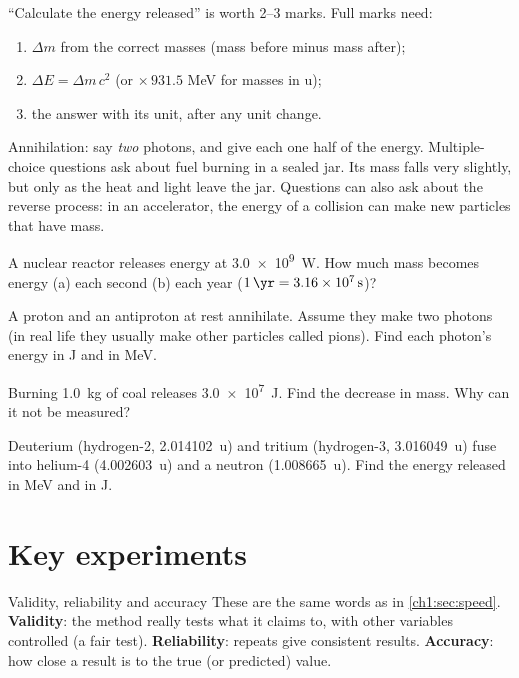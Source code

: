 \begin{examtip}
``Calculate the energy released'' is worth 2--3 marks. Full marks need:
\begin{enumerate}
  \item $\Delta m$ from the correct masses (mass before minus mass after);
  \item $\Delta E = \Delta m\,c^2$ (or $\times\,931.5$ MeV for masses in u);
  \item the answer with its unit, after any unit change.
\end{enumerate}
Annihilation: say \emph{two} photons, and give each one half of the energy. Multiple-choice
questions ask about fuel burning in a sealed jar. Its mass falls very slightly, but only as the
heat and light leave the jar. Questions can also ask about the reverse process: in an
accelerator, the energy of a collision can make new particles that have mass.
\end{examtip}

\begin{quickcheck}
  \item A nuclear reactor releases energy at \qty{3.0e9}{W}. How much mass becomes energy
        (a) each second (b) each year ($\qty{1}{\yr} = \qty{3.16e7}{s}$)?
  \item A proton and an antiproton at rest annihilate. Assume they make two photons (in real
        life they usually make other particles called pions). Find each photon's energy in J
        and in MeV.
  \item Burning \qty{1.0}{kg} of coal releases \qty{3.0e7}{J}. Find the decrease in mass. Why can
        it not be measured?
  \item Deuterium (hydrogen-2, \qty{2.014102}{\amu}) and tritium (hydrogen-3,
        \qty{3.016049}{\amu}) fuse into helium-4
        (\qty{4.002603}{\amu}) and a neutron (\qty{1.008665}{\amu}). Find the energy released in MeV
        and in J.
\end{quickcheck}

\section{Key experiments}\label{ch4:sec:experiments}

\begin{refresher}{Validity, reliability and accuracy}
These are the same words as in \cref{ch1:sec:speed}.
\textbf{Validity}: the method really tests what it claims to, with other variables controlled
(a fair test). \textbf{Reliability}: repeats give consistent results. \textbf{Accuracy}: how
close a result is to the true (or predicted) value.
\end{refresher}

